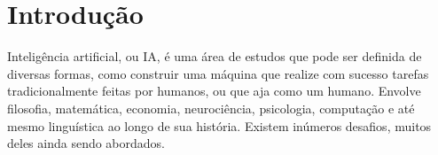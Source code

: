 \chapter{Introdução}
\label{cap:introducao}

Inteligência artificial, ou IA, é uma área de estudos que pode ser definida de diversas formas, como construir uma máquina que realize com sucesso tarefas tradicionalmente feitas por humanos, ou que aja como um humano.
Envolve filosofia, matemática, economia, neurociência, psicologia, computação e até mesmo linguística ao longo de sua história.
Existem inúmeros desafios, muitos deles ainda sendo abordados.

%
%
%
